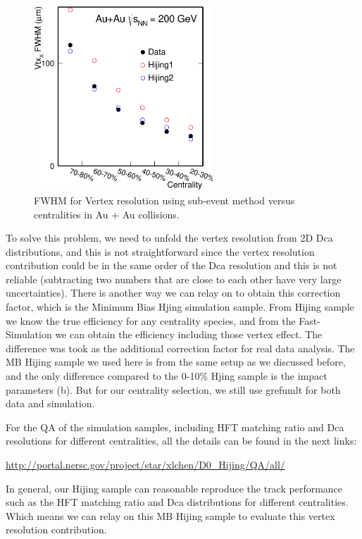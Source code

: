 \begin{figure}
\centering
\includegraphics[width=0.6\textwidth]{figure/Run14_D0HFT/vtxX_vsCent_pwg.eps}
\caption{ FWHM for Vertex resolution using sub-event method versus centralities in Au + Au collisions.}
\label{vtxX_vsCent} 
\end{figure}

To solve this problem, we need to unfold the vertex resolution from 2D Dca distributions, and this is not straightforward since the vertex resolution contribution could be in the same order of the Dca resolution and this is not reliable (subtracting two numbers that are close to each other have very large uncertainties). There is another way we can relay on to obtain this correction factor, which is the Minimum Bias Hjing simulation sample. From Hijing sample we know the true efficiency for any centrality species, and from the Fast-Simulation we can obtain the efficiency including those vertex effect. The difference was took as the additional correction factor for real data analysis. The MB Hijing sample we used here is from the same setup as we discussed before, and the only difference compared to the 0-10\% Hjing sample is the impact parameters (b). But for our centrality selection, we still use grefumlt for both data and simulation.

For the QA of the simulation samples, including HFT matching ratio and Dca resolutions for different centralities, all the details can be found in the next links:

\url{http://portal.nersc.gov/project/star/xlchen/D0_Hijing/QA/all/}

In general, our Hijing sample can reasonable reproduce the track performance such as the HFT matching ratio and Dca distributions for different centralities. Which means we can relay on this MB Hijing sample to evaluate this vertex resolution contribution.

